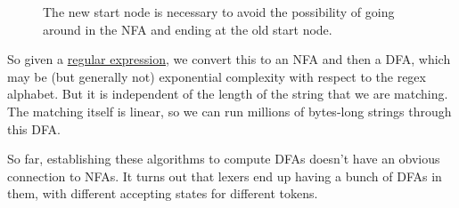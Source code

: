 \begin{algo}
\begin{enumerate}
\begin{figure}[H]
          \caption{ The new start node is necessary to avoid the possibility of going around in the NFA and ending at the old start node. }

          \label{fig:kleene_star}
        \end{figure}
        
    \end{enumerate}
  \end{algo}

  So given a \hyperref[def:regular_expression]{regular expression}, we convert this to an NFA and then a DFA, which may be (but generally not) exponential complexity with respect to the regex alphabet. But it is independent of the length of the string that we are matching. The matching itself is linear, so we can run millions of bytes-long strings through this DFA. 

  So far, establishing these algorithms to compute DFAs doesn't have an obvious connection to NFAs. It turns out that lexers end up having a bunch of DFAs in them, with different accepting states for different tokens. 

